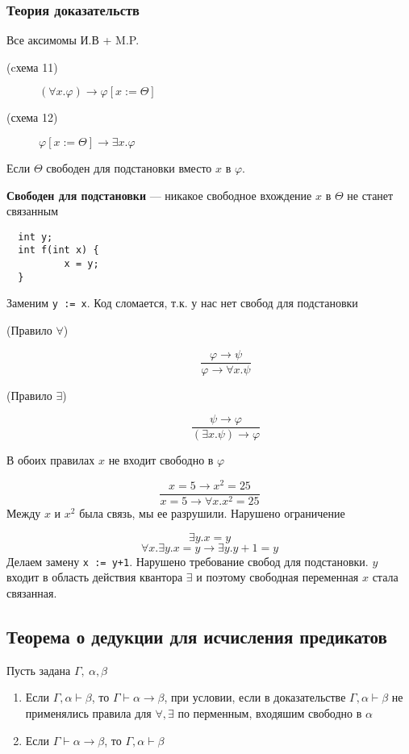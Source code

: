\documentclass[english]{article}
\begin{document}
\subsubsection{Теория доказательств}
\label{sec:org4a1d4ab}
Все аксимомы И.В + M.P.
\begin{description}
	\item[{(cхема 11)}] \((\forall x. \varphi) \to \varphi[x:=\Theta]\)
	\item[{(схема 12)}] \(\varphi[x:=\Theta]\to \exists x. \varphi\)
\end{description}
Если \(\Theta\) свободен для подстановки вместо \(x\) в \(\varphi\).
\begin{definition}
	\textbf{Свободен для подстановки} --- никакое свободное вхождение \(x\) в \(\Theta\) не станет связанным
\end{definition}
\begin{examp}
	\-
	\begin{verbatim}
  int y;
  int f(int x) {
          x = y;
  }
\end{verbatim}
	Заменим \texttt{y := x}. Код сломается, т.к. у нас нет свобод для подстановки
\end{examp}
\begin{description}
	\item[{(Правило \(\forall\))}] \[\frac{\varphi \to \psi}{\varphi \to \forall x. \psi}\]
	\item[{(Правило \(\exists\))}] \[ \frac{\psi \to \varphi}{(\exists x.\psi) \to \varphi} \]
\end{description}
В обоих правилах \(x\) не входит свободно в \(\varphi\)
\begin{examp}
	\[ \frac{x = 5 \to x^2 = 25}{x = 5 \to \forall x. x^2 = 25} \]
	Между \(x\) и \(x^2\) была связь, мы ее разрушили. Нарушено ограничение
\end{examp}
\begin{examp}
	\[ \exists y. x = y \]
	\[ \forall x. \exists y. x = y \to \exists y. y + 1 = y \]
	Делаем замену \texttt{x := y+1}. Нарушено требование свобод для подстановки. \(y\) входит в область действия квантора \(\exists\) и поэтому свободная переменная \(x\) стала связанная.
\end{examp}
\subsection{Теорема о дедукции для исчисления предикатов}
\label{sec:org595d2e3}
\begin{theorem}
	Пусть задана \(\Gamma,\ \alpha,\beta\)
	\begin{enumerate}
		\item Если \(\Gamma, \alpha \vdash \beta\), то \(\Gamma \vdash \alpha \to \beta\), при условии, если в доказательстве \(\Gamma, \alpha \vdash \beta\) не применялись правила для \(\forall, \exists\) по перменным, входяшим свободно в \(\alpha\)
		\item Если \(\Gamma \vdash \alpha \to \beta\), то \(\Gamma, \alpha \vdash \beta\)
	\end{enumerate}
	\label{org00a29a3}
\end{theorem}
\end{document}
